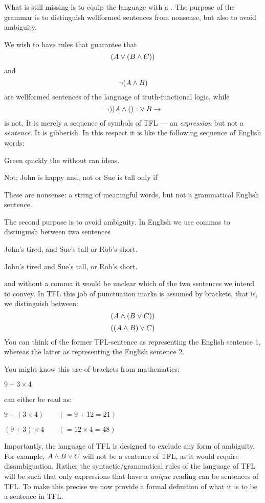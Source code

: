 What is still missing is to equip the language with a . The purpose of the grammar is to distinguish wellformed sentences from nonsense, but also to avoid ambiguity.

We wish to have rules that guarantee that
$$(A\vee (B\mathbin{\wedge} C))$$ and $$\neg (A\mathbin{\wedge} B)$$
are wellformed sentences of the language of truth-functional logic, while
$$\neg))A\mathbin{\wedge}()\neg\vee B\rightarrow$$
is not. It is merely a sequence of symbols of TFL --- an \emph{expression} but not a \emph{sentence}. It is gibberish. 
In this respect it is like the following sequence of English words:
\begin{ebullet}
\item Green quickly the without ran ideas.
\item Not; John is happy and, not or Sue is tall only if
\end{ebullet}
These are nonsense: a string of meaningful words, but not a grammatical English sentence.



The second purpose is to avoid ambiguity. In English we use commas to distinguish between two sentences
\begin{earg}
\item[\ex{engamb1}] John's tired, and Sue's tall or Rob's short.
\item[\ex{engamb2}] John's tired and Sue's tall, or Rob's short.
\end{earg}
and without a comma it would be unclear which of the two sentences we intend to convey. In TFL this job of punctuation marks is assumed by brackets, that is, we distinguish between:
$$(A\mathbin{\wedge}(B\vee C))$$
$$((A\mathbin{\wedge} B)\vee C)$$
You can think of the former TFL-sentence as representing the English sentence 1, whereas the latter as representing the English sentence 2.

You might know this use of brackets from mathematics:
\begin{earg}
\item[\ex{mathamb}] $9 + 3 \times 4$
\end{earg}
can either be read as:
\begin{earg}
\item[\ex{mathamb1}] $9 + (3 \times 4) \qquad(=9+12=21)$
\item[\ex{mathamb2}] $(9+3) \times 4 \qquad(=12\times 4=48)$
\end{earg}

Importantly, the language of TFL is designed to exclude any form of ambiguity. For example, $A\mathbin{\wedge} B\vee C$ will not be a sentence of TFL, as it would require disambiguation. Rather the syntactic/grammatical rules of the language of TFL will be such that only expressions that have a \emph{unique} reading can be sentences of TFL. To make this precise we now provide a formal definition of what it is to be a sentence in TFL.

